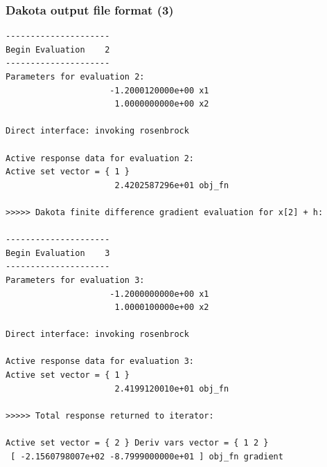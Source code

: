 \documentclass[t]{beamer}
\begin{document}

\begin{frame}[fragile]
  \frametitle{Dakota output file format (3)}
  \begin{tiny}\begin{lstlisting}
---------------------
Begin Evaluation    2
---------------------
Parameters for evaluation 2:
                     -1.2000120000e+00 x1
                      1.0000000000e+00 x2

Direct interface: invoking rosenbrock

Active response data for evaluation 2:
Active set vector = { 1 }
                      2.4202587296e+01 obj_fn

>>>>> Dakota finite difference gradient evaluation for x[2] + h:

---------------------
Begin Evaluation    3
---------------------
Parameters for evaluation 3:
                     -1.2000000000e+00 x1
                      1.0000100000e+00 x2

Direct interface: invoking rosenbrock

Active response data for evaluation 3:
Active set vector = { 1 }
                      2.4199120010e+01 obj_fn

>>>>> Total response returned to iterator:

Active set vector = { 2 } Deriv vars vector = { 1 2 }
 [ -2.1560798007e+02 -8.7999000000e+01 ] obj_fn gradient\end{lstlisting}\end{tiny}
\end{frame}

\end{document}
